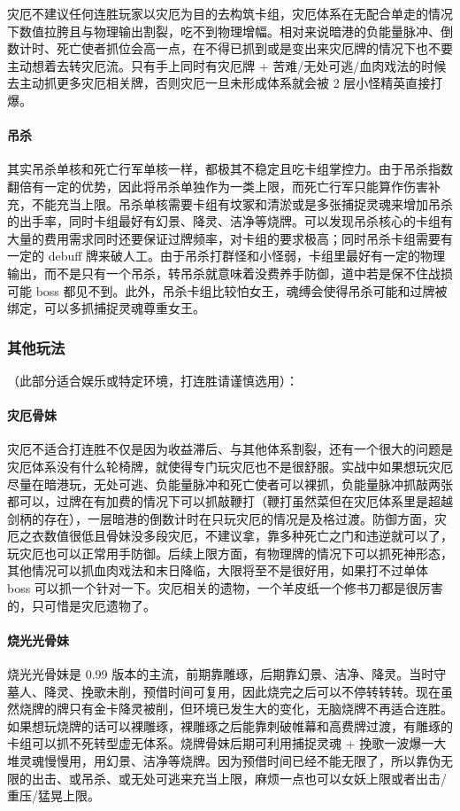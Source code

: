 ﻿\documentclass[12pt, a4paper]{article}
\begin{document}
灾厄不建议任何连胜玩家以灾厄为目的去构筑卡组，灾厄体系在无配合单走的情况下数值拉胯且与物理输出割裂，吃不到物理增幅。相对来说暗港的负能量脉冲、倒数计时、死亡使者抓位会高一点，在不得已抓到或是变出来灾厄牌的情况下也不要主动想着去转灾厄流。只有手上同时有灾厄牌 + 苦难/无处可逃/血肉戏法的时候去主动抓更多灾厄相关牌，否则灾厄一旦未形成体系就会被 2 层小怪精英直接打爆。

\paragraph{吊杀}
其实吊杀单核和死亡行军单核一样，都极其不稳定且吃卡组掌控力。由于吊杀指数翻倍有一定的优势，因此将吊杀单独作为一类上限，而死亡行军只能算作伤害补充，不能充当上限。吊杀单核需要卡组有坟冢和清淤或是多张捕捉灵魂来增加吊杀的出手率，同时卡组最好有幻景、降灵、洁净等烧牌。可以发现吊杀核心的卡组有大量的费用需求同时还要保证过牌频率，对卡组的要求极高；同时吊杀卡组需要有一定的 debuff 牌来破人工。由于吊杀打群怪和小怪弱，卡组里最好有一定的物理输出，而不是只有一个吊杀，转吊杀就意味着没费养手防御，道中若是保不住战损可能 boss 都见不到。此外，吊杀卡组比较怕女王，魂缚会使得吊杀可能和过牌被绑定，可以多抓捕捉灵魂尊重女王。

\subsubsection{其他玩法}
（此部分适合娱乐或特定环境，打连胜请谨慎选用）：

\paragraph{灾厄骨妹}
灾厄不适合打连胜不仅是因为收益滞后、与其他体系割裂，还有一个很大的问题是灾厄体系没有什么轮椅牌，就使得专门玩灾厄也不是很舒服。实战中如果想玩灾厄尽量在暗港玩，无处可逃、负能量脉冲和死亡使者可以裸抓，负能量脉冲抓敲两张都可以，过牌在有加费的情况下可以抓敲鞭打（鞭打虽然菜但在灾厄体系里是超越剑柄的存在），一层暗港的倒数计时在只玩灾厄的情况是及格过渡。防御方面，灾厄之衣数值很低且骨妹没多段灾厄，不建议拿，靠多种死亡之门和违逆就可以了，玩灾厄也可以正常用手防御。后续上限方面，有物理牌的情况下可以抓死神形态，其他情况可以抓血肉戏法和末日降临，大限将至不是很好用，如果打不过单体 boss 可以抓一个针对一下。灾厄相关的遗物，一个羊皮纸一个修书刀都是很厉害的，只可惜是灾厄遗物了。

\paragraph{烧光光骨妹}
烧光光骨妹是 0.99 版本的主流，前期靠雕琢，后期靠幻景、洁净、降灵。当时守墓人、降灵、挽歌未削，预借时间可复用，因此烧完之后可以不停转转转。现在虽然烧牌的牌只有金卡降灵被削，但环境已发生大的变化，无脑烧牌不再适合连胜。如果想玩烧牌的话可以裸雕琢，裸雕琢之后能靠刺破帷幕和高费牌过渡，有雕琢的卡组可以抓不死转型虚无体系。烧牌骨妹后期可利用捕捉灵魂 + 挽歌一波爆一大堆灵魂慢慢用，用幻景、洁净等烧牌。因为预借时间已经不能无限了，所以靠伪无限的出击、或吊杀、或无处可逃来充当上限，麻烦一点也可以女妖上限或者出击/重压/猛晃上限。
\end{document}
